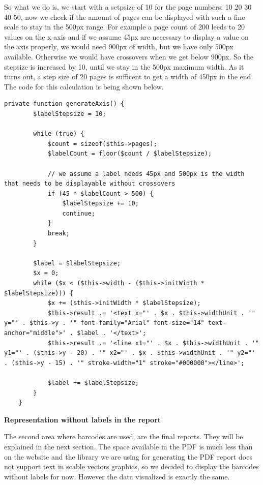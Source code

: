 So what we do is, we start with a setpsize of 10 for the page numbers: 10 20 30 40 50, now we check if the amount of pages can be displayed with such a fine scale to stay in the 500px range. For example a page count of 200 leeds to 20 values on the x axis and if we assume 45px are necessary to display a value on the axis properly, we would need 900px of width, but we have only 500px available. Otherwise we would have crossovers when we get below 900px. So the stepsize is increased by 10, until we stay in the 500px maximum width. As it turns out, a step size of 20 pages is sufficent to get a width of 450px in the end. The code for this calculation is being shown below.

\begin{lstlisting}[caption=Generating the barcode x axis]
private function generateAxis() {
        $labelStepsize = 10;

        while (true) {
            $count = sizeof($this->pages);
            $labelCount = floor($count / $labelStepsize);

            // we assume a label needs 45px and 500px is the width that needs to be displayable without crossovers
            if (45 * $labelCount > 500) {
                $labelStepsize += 10;
                continue;
            }
            break;
        }

        $label = $labelStepsize;
        $x = 0;
        while ($x < ($this->width - ($this->initWidth * $labelStepsize))) {
            $x += ($this->initWidth * $labelStepsize);
            $this->result .= '<text x="' . $x . $this->widthUnit . '" y="' . $this->y . '" font-family="Arial" font-size="14" text-anchor="middle">' . $label . '</text>';
            $this->result .= '<line x1="' . $x . $this->widthUnit . '" y1="' . ($this->y - 20) . '" x2="' . $x . $this->widthUnit . '" y2="' . ($this->y - 15) . '" stroke-width="1" stroke="#000000"></line>';

            $label += $labelStepsize;
        }
    }
\end{lstlisting}

\textbf{Representation without labels in the report}

The second area where barcodes are used, are the final reports. They will be explained in the next section. The space available in the PDF is much less than on the website and the library we are using for generating the PDF report does not support text in scable vectors graphics, so we decided to display the barcodes without labels for now. However the data visualized is exactly the same.